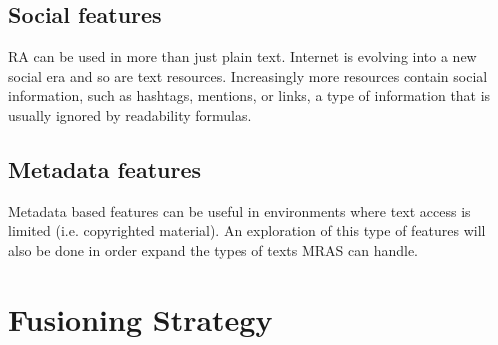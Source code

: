 \documentclass{bsu-ms}
\begin{document}
\subsection{Social features}
RA can be used in more than just plain text. Internet is evolving into a new social era and so are text resources. Increasingly more resources contain social information, such as hashtags, mentions, or links, a type of information that is usually ignored by readability formulas.

\subsection{Metadata features}
Metadata based features can be useful in environments where text access is limited (i.e. copyrighted material). An exploration of this type of features will also be done in order expand the types of texts MRAS can handle.




\section{Fusioning Strategy}
\label{sec:fusion}
\end{document}
